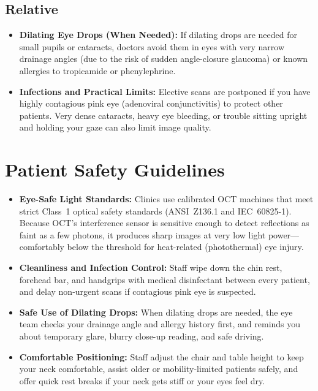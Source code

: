 \subsection{Relative}
\begin{itemize}
\item \textbf{Dilating Eye Drops (When Needed):} If dilating drops are needed for small pupils or cataracts, doctors avoid them in eyes with very narrow drainage angles (due to the risk of sudden angle-closure glaucoma) or known allergies to tropicamide or phenylephrine.
\item \textbf{Infections and Practical Limits:} Elective scans are postponed if you have highly contagious pink eye (adenoviral conjunctivitis) to protect other patients. Very dense cataracts, heavy eye bleeding, or trouble sitting upright and holding your gaze can also limit image quality.
\end{itemize}

\section{Patient Safety Guidelines}
\begin{itemize}
\item \textbf{Eye-Safe Light Standards:} Clinics use calibrated OCT machines that meet strict Class~1 optical safety standards (ANSI~Z136.1 and IEC~60825-1). Because OCT's interference sensor is sensitive enough to detect reflections as faint as a few photons, it produces sharp images at very low light power---comfortably below the threshold for heat-related (photothermal) eye injury.
\item \textbf{Cleanliness and Infection Control:} Staff wipe down the chin rest, forehead bar, and handgrips with medical disinfectant between every patient, and delay non-urgent scans if contagious pink eye is suspected.
\item \textbf{Safe Use of Dilating Drops:} When dilating drops are needed, the eye team checks your drainage angle and allergy history first, and reminds you about temporary glare, blurry close-up reading, and safe driving.
\item \textbf{Comfortable Positioning:} Staff adjust the chair and table height to keep your neck comfortable, assist older or mobility-limited patients safely, and offer quick rest breaks if your neck gets stiff or your eyes feel dry.
\end{itemize}

